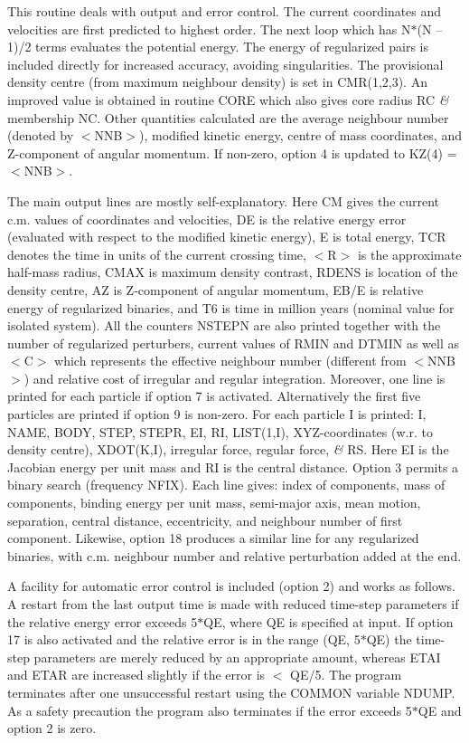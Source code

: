  This routine deals with output and error control.  The current
 coordinates and velocities are first predicted to highest order.  The next loop
 which has N$\ast$(N -- 1)/2 terms evaluates the potential energy.  The energy
 of regularized pairs is included directly for increased accuracy, avoiding
 singularities.  The provisional density centre (from maximum
 neighbour density) is set in CMR(1,2,3).  An improved value is 
 obtained in routine CORE which also gives core radius RC {\it\&} 
 membership NC. Other quantities calculated
 are the average neighbour number (denoted by $<$NNB$>$),
 modified kinetic energy, centre of mass
 coordinates, and Z-component of angular momentum.  If non-zero,
 option 4 is updated to KZ(4) = $<$NNB$>$.  

   The main output lines are mostly self-explanatory. Here CM gives
 the current c.m. values of coordinates and velocities, DE is the
 relative energy error (evaluated with respect to the modified
 kinetic energy), E is total energy, TCR denotes the time in units
 of the current crossing time, $<$R$>$ is the approximate half-mass
 radius, CMAX is maximum density contrast, RDENS is location of
 the density centre, AZ is Z-component of angular momentum, EB/E is
 relative energy of regularized binaries, and T6 is time in million
 years (nominal value for isolated system). All the counters NSTEPN
 are also printed together with the number of regularized perturbers,
 current values of RMIN and DTMIN as well as $<$C$>$ which represents the effective
 neighbour number (different from $<$NNB$>$) and relative cost of
 irregular and regular integration. Moreover, one line is printed
 for each particle if option 7 is activated.  Alternatively the first five
 particles are printed if option 9 is non-zero.  For each particle I is printed:
 I, NAME, BODY, STEP, STEPR, EI, RI, LIST(1,I), XYZ-coordinates (w.r. to
 density centre), XDOT(K,I), irregular force, regular force, {\it\&} RS.  Here EI is the
 Jacobian energy per unit mass and RI is the central distance.  
 Option 3 permits a binary search (frequency NFIX).
  Each line gives: index of components,
 mass of components, binding energy per unit mass, semi-major axis,
 mean motion, separation, central distance, eccentricity, and 
 neighbour number of first component.
 Likewise, option 18 produces a similar line for any regularized 
 binaries, with c.m. neighbour number and relative perturbation  
 added at the end.

 A facility for automatic error control is included (option 2) and works as
 follows.  A restart from the last output time is made with reduced time-step
 parameters if the relative energy error exceeds 5$\ast$QE, where QE is
 specified at input.  If option 17 is also activated and the relative error is
 in the range (QE, 5$\ast$QE) the time-step parameters are merely reduced by an
 appropriate amount, whereas ETAI and ETAR are increased slightly if the error
 is $<$ QE/5.  The program terminates after one unsuccessful restart
 using the COMMON variable NDUMP.  As a safety precaution the program also
 terminates if the error exceeds 5$\ast$QE and option 2 is zero.

